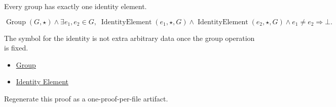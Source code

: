 \begin{remark*}
Every group has exactly one identity element.
\end{remark*}

\begin{remark*}
\[
\operatorname{Group}(G,\star)
\land
\exists e_1,e_2\in G,\;
\operatorname{IdentityElement}(e_1,\star,G)
\land
\operatorname{IdentityElement}(e_2,\star,G)
\land e_1\neq e_2
\Longrightarrow \bot.
\]
\end{remark*}

\begin{remark*}[Interpretation]
The symbol for the identity is not extra arbitrary data once the group
operation is fixed.
\end{remark*}

\begin{dependencies}
\begin{itemize}
  \item \hyperref[def:algebraic-group]{Group}
  \item \hyperref[def:identity-element]{Identity Element}
\end{itemize}
\end{dependencies}

\begin{remark*}
Regenerate this proof as a one-proof-per-file artifact.
\end{remark*}
